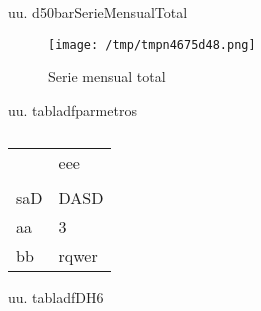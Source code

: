 \documentclass[a4paper,10pt,twocolumn]{article}
\begin{document}
\begin{Form}
\begin{figure}[H]
                    \label{fig:dfassssdfsa}
                    \end{figure}
                    

uu. d50barSerieMensualTotal

\begin{figure}[H] \centering
                    
                    \texttt{[image: /tmp/tmpn4675d48.png]}
                    \caption{Serie mensual total}
                    
                    \label{fig:dfassssdfsa}
                    \end{figure}
                    

uu. tabladfparmetros


                    \begin{table}[H] \centering
                        {
                        \begin{tabular}{ll}
\toprule
 & eee \\
 &  \\
\midrule
saD & DASD \\
aa & 3 \\
bb & rqwer \\
\bottomrule
\end{tabular}

                        }
                        \caption{}
                    \end{table}
                    

uu. tabladfDH6



\end{Form}
\end{document}
